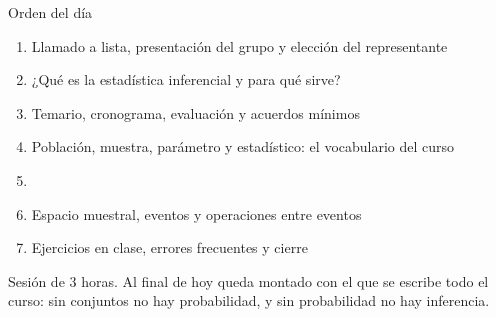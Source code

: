 \documentclass[aspectratio=169,10pt]{beamer}
\begin{document}
\portada

\begin{frame}{Orden del día}
  \begin{enumerate}
    \item Llamado a lista, presentación del grupo y elección del representante
    \item ¿Qué es la estadística inferencial y para qué sirve?
    \item Temario, cronograma, evaluación y acuerdos mínimos
    \item Población, muestra, parámetro y estadístico: el vocabulario del curso
    \item {}
    \item Espacio muestral, eventos y operaciones entre eventos
    \item Ejercicios en clase, errores frecuentes y cierre
  \end{enumerate}

  \vspace{0.25cm}
  {\footnotesize\color{uniGris} Sesión de 3 horas. Al final de hoy queda
  montado  con el que se escribe todo el curso: sin
  conjuntos no hay probabilidad, y sin probabilidad no hay inferencia.}
\end{frame}
\end{document}
